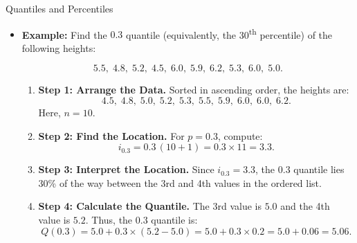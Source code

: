 \documentclass[8pt, usepdftitle=false]{beamer}
\begin{document}
\begin{frame}[allowframebreaks]{Quantiles and Percentiles}
\begin{itemize}
\begin{enumerate}
    this is the sorted data set,

    \medskip

  \item \textbf{Find the Location:}  
    Compute the location of the \(p^{th}\) quantile, denoted by \(i_p\), using the formula:
    $$
    i_p = p\,(n+1).
    $$

    \medskip
    
  \item \textbf{Interpret the Location:}  
    If \(i_p\) is not an integer, it indicates that the \(p^{th}\) quantile lies between two data points. For example, if \(p = 0.8\) and \(i_{0.8} = 10.4\), then the 0.8 quantile (equivalently, the 80th percentile) is 40\% of the way between the value in position 10 and the value in position 11.
    
    \medskip

  \item \textbf{Calculate the Quantile:}  
    Suppose the value in position \(k\) is \(x_{(k)}\) and in position \(k+1\) is \(x_{(k+1)}\), and let \(\gamma\) be the fractional part of \(i_p\). Then the \(p^{th}\) quantile is computed as:
    $$
    q(p) = x_{(k)} + \gamma\, \Bigl(x_{(k+1)} - x_{(k)}\Bigr).
    $$
\end{enumerate}

\item \textbf{Example:} Find the \(0.3\) quantile (equivalently, the 30\textsuperscript{th} percentile) of the following heights:


\[
5.5,\; 4.8,\; 5.2,\; 4.5,\; 6.0,\; 5.9,\; 6.2,\; 5.3,\; 6.0,\; 5.0.
\]

\begin{enumerate}
  \item \textbf{Step 1: Arrange the Data.}  
    Sorted in ascending order, the heights are:
    \[
    4.5,\; 4.8,\; 5.0,\; 5.2,\; 5.3,\; 5.5,\; 5.9,\; 6.0,\; 6.0,\; 6.2.
    \]
    Here, \(n = 10\).
    
  \item \textbf{Step 2: Find the Location.}  
    For \(p = 0.3\), compute:
    $$
    i_{0.3} = 0.3 \,(10+1) = 0.3 \times 11 = 3.3.
    $$
    
  \item \textbf{Step 3: Interpret the Location.}  
    Since \(i_{0.3} = 3.3\), the \(0.3\) quantile lies 30\% of the way between the 3rd and 4th values in the ordered list.
    
  \item \textbf{Step 4: Calculate the Quantile.}  
    The 3rd value is \(5.0\) and the 4th value is \(5.2\). Thus, the \(0.3\) quantile is:
    $$
    Q(0.3) = 5.0 + 0.3 \times (5.2 - 5.0) = 5.0 + 0.3 \times 0.2 = 5.0 + 0.06 = 5.06.
    $$
\end{enumerate}



\end{itemize}




\end{frame}
\end{document}
